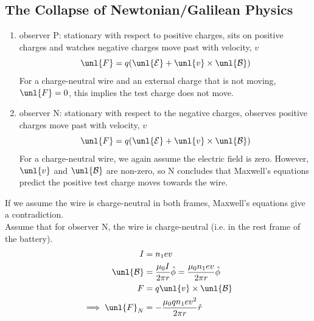 \documentclass[a4paper, 11pt, normalem]{report}
\newcommand\E{\mathcal{E}}
\newcommand\uE{\unl{\E}}
\newcommand\B{\mathcal{B}}
\newcommand\uB{\unl{\B}}
\newcommand\hr{\hat{r}}
\begin{document}
\subsection{The Collapse of Newtonian/Galilean Physics}
\begin{enumerate}
    \item observer P: stationary with respect to positive charges, sits on positive charges and watches negative charges move past with velocity, $v$
    \begin{equation}
        \unl{F} = q(\uE + \unl{v}\times\uB)
    \end{equation}
    For a charge-neutral wire and an external charge that is not moving, $\unl{F} = 0$, this implies the test charge does not move.
    \item observer N: stationary with respect to the negative charges, observes positive charges move past with velocity, $v$
    \begin{equation}
        \unl{F} = q(\uE + \unl{v}\times\uB)
    \end{equation}
    For a charge-neutral wire, we again assume the electric field is zero.
    However, $\unl{v}$ and $\uB$ are non-zero, so N concludes that Maxwell's equations predict the positive test charge moves towards the wire.
\end{enumerate}
If we assume the wire is charge-neutral in both frames, Maxwell's equations give a contradiction. \\
Assume that for observer N, the wire is charge-neutral (i.e. in the rest frame of the battery).
\begin{align}
    I &= n_1ev \\
    \uB &= \frac{\mu_0I}{2\pi r}\hat{\phi} = \frac{\mu_0 n_1ev}{2\pi r}\hat{\phi} \\
    F &= q\unl{v}\times\uB \\
    \implies \unl{F}_N &= -\frac{\mu_0 qn_1ev^2}{2\pi r}\hr
\end{align}
\end{document}
